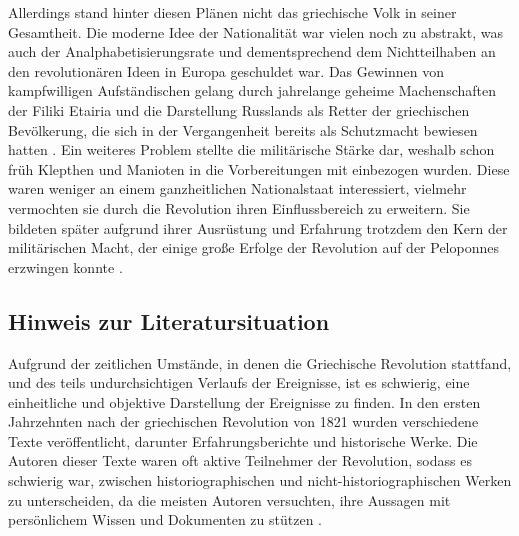 \documentclass[preprint]{geomorphica} %
\begin{document}
Allerdings stand hinter diesen Plänen nicht das griechische Volk in seiner Gesamtheit.
Die moderne Idee der Nationalität war vielen noch zu abstrakt, was auch der Analphabetisierungsrate und dementsprechend dem Nichtteilhaben an den revolutionären Ideen in Europa geschuldet war.
Das Gewinnen von kampfwilligen Aufständischen gelang durch jahrelange geheime Machenschaften der Filiki Etairia und die Darstellung Russlands als Retter der griechischen Bevölkerung, die sich in der Vergangenheit bereits als Schutzmacht bewiesen hatten \cite{Dakin1952, Konstantinou2012}.
Ein weiteres Problem stellte die militärische Stärke dar, weshalb schon früh Klepthen und Manioten in die Vorbereitungen mit einbezogen wurden.
Diese waren weniger an einem ganzheitlichen Nationalstaat interessiert, vielmehr vermochten sie durch die Revolution ihren Einflussbereich zu erweitern.
Sie bildeten später aufgrund ihrer Ausrüstung und Erfahrung trotzdem den Kern der militärischen Macht, der einige große Erfolge der Revolution auf der Peloponnes erzwingen konnte \cite{Dakin1952, Clair2008}. 

\subsection{Hinweis zur Literatursituation}

Aufgrund der zeitlichen Umstände, in denen die Griechische Revolution stattfand, und des teils undurchsichtigen Verlaufs der Ereignisse, ist es schwierig, eine einheitliche und objektive Darstellung der Ereignisse zu finden. 
In den ersten Jahrzehnten nach der griechischen Revolution von 1821 wurden verschiedene Texte veröffentlicht, darunter Erfahrungsberichte und historische Werke. Die Autoren dieser Texte waren oft aktive Teilnehmer der Revolution, sodass es schwierig war, zwischen historiographischen und nicht-historiographischen Werken zu unterscheiden, da die meisten Autoren versuchten, ihre Aussagen mit persönlichem Wissen und Dokumenten zu stützen \cite{Stathis2021}.
\end{document}
